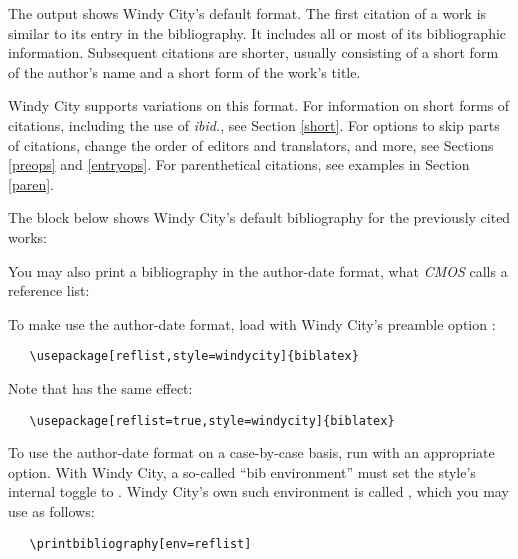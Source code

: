 \documentclass[11pt,letterpaper,oneside]{article}
\begin{document}
The output shows Windy City's default format. The first citation of a
work is similar to its entry in the bibliography. It includes all or
most of its bibliographic information. Subsequent citations are
shorter, usually consisting of a short form of the author's name and a
short form of the work's title.

Windy City supports variations on this format. For information on
short forms of citations, including the use of \textit{ibid.}, see
Section \ref{short}. For options to skip parts of citations, change
the order of editors and translators, and more, see Sections
\ref{preops} and \ref{entryops}. For parenthetical citations, see
examples in Section \ref{paren}.

The block below shows Windy City's default bibliography for the
previously cited works:

\begin{bibonly}
\nocite{kaiser1964,morley1995,schwartz1992}
\end{bibonly}

\noindent You may also print a bibliography in the author-date format,
what \textit{CMOS} calls a reference list:

\begin{refonly}
\nocite{kaiser1964,morley1995,schwartz1992}
\end{refonly}

To make  use the author-date format, load
\biblatex with Windy City's preamble option :

\begin{verbatim}
   \usepackage[reflist,style=windycity]{biblatex}
\end{verbatim}

\noindent Note that  has the same effect:

\begin{verbatim}
   \usepackage[reflist=true,style=windycity]{biblatex}
\end{verbatim}

To use the author-date format on a case-by-case basis, run
 with an appropriate  option. With
Windy City, a so-called ``bib environment'' must set the style's
internal  toggle to . Windy City's own such
environment is called , which you may use as follows:

\begin{verbatim}
   \printbibliography[env=reflist]
\end{verbatim}
\end{document}

